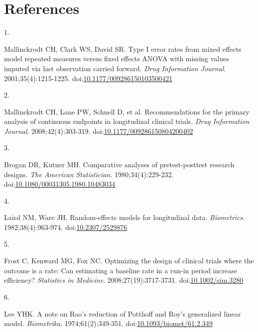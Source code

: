 \documentclass[
  11pt,
]{article}
\newlength{\cslhangindent}
\newlength{\csllabelwidth}
\newenvironment{CSLReferences}[2] %
 {\begin{list}{}{%
  \setlength{\itemindent}{0pt}
  \setlength{\leftmargin}{0pt}
  \setlength{\parsep}{0pt}
  \ifodd #1
   \setlength{\leftmargin}{\cslhangindent}
   \setlength{\itemindent}{-1\cslhangindent}
  \fi
  \setlength{\itemsep}{#2\baselineskip}}}
 {\end{list}}
\newcommand{\CSLLeftMargin}[1]{\parbox[t]{\csllabelwidth}{\strut#1\strut}}
\newcommand{\CSLRightInline}[1]{\parbox[t]{\linewidth - \csllabelwidth}{\strut#1\strut}}
\begin{document}
\section*{References}\label{references}

\protect{}\label{refs}
\begin{CSLReferences}{0}{1}
\CSLLeftMargin{1. }%
\CSLRightInline{Mallinckrodt CH, Clark WS, David SR. Type {I} error rates from mixed effects model repeated measures versus fixed effects {ANOVA} with missing values imputed via last observation carried forward. \emph{Drug Information Journal}. 2001;35(4):1215-1225. doi:\href{https://doi.org/10.1177/009286150103500421}{10.1177/009286150103500421}}

\CSLLeftMargin{2. }%
\CSLRightInline{{Mallinckrodt CH, Lane PW, Schnell D, et al.} Recommendations for the primary analysis of continuous endpoints in longitudinal clinical trials. \emph{Drug Information Journal}. 2008;42(4):303-319. doi:\href{https://doi.org/10.1177/009286150804200402}{10.1177/009286150804200402}}

\CSLLeftMargin{3. }%
\CSLRightInline{Brogan DR, Kutner MH. Comparative analyses of pretest-posttest research designs. \emph{The American Statistician}. 1980;34(4):229-232. doi:\href{https://doi.org/10.1080/00031305.1980.10483034}{10.1080/00031305.1980.10483034}}

\CSLLeftMargin{4. }%
\CSLRightInline{Laird NM, Ware JH. Random-effects models for longitudinal data. \emph{Biometrics}. 1982;38(4):963-974. doi:\href{https://doi.org/10.2307/2529876}{10.2307/2529876}}

\CSLLeftMargin{5. }%
\CSLRightInline{Frost C, Kenward MG, Fox NC. Optimizing the design of clinical trials where the outcome is a rate: Can estimating a baseline rate in a run-in period increase efficiency? \emph{Statistics in Medicine}. 2008;27(19):3717-3731. doi:\href{https://doi.org/10.1002/sim.3280}{10.1002/sim.3280}}

\CSLLeftMargin{6. }%
\CSLRightInline{Lee YHK. A note on {Rao's} reduction of {Potthoff} and {Roy's} generalized linear model. \emph{Biometrika}. 1974;61(2):349-351. doi:\href{https://doi.org/10.1093/biomet/61.2.349}{10.1093/biomet/61.2.349}}


\end{CSLReferences}
\end{document}
